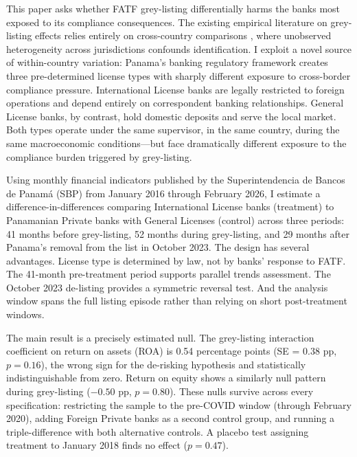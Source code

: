 \documentclass[12pt]{article}
\begin{document}
This paper asks whether FATF grey-listing differentially harms the banks most exposed to its compliance consequences. The existing empirical literature on grey-listing effects relies entirely on cross-country comparisons \citep{nkusu2023,imf2021,collin2022,masciandaro2017}, where unobserved heterogeneity across jurisdictions confounds identification. I exploit a novel source of within-country variation: Panama's banking regulatory framework creates three pre-determined license types with sharply different exposure to cross-border compliance pressure. International License banks are legally restricted to foreign operations and depend entirely on correspondent banking relationships. General License banks, by contrast, hold domestic deposits and serve the local market. Both types operate under the same supervisor, in the same country, during the same macroeconomic conditions---but face dramatically different exposure to the compliance burden triggered by grey-listing.

Using monthly financial indicators published by the Superintendencia de Bancos de Panam\'a (SBP) from January 2016 through February 2026, I estimate a difference-in-differences comparing International License banks (treatment) to Panamanian Private banks with General Licenses (control) across three periods: 41 months before grey-listing, 52 months during grey-listing, and 29 months after Panama's removal from the list in October 2023. The design has several advantages. License type is determined by law, not by banks' response to FATF. The 41-month pre-treatment period supports parallel trends assessment. The October 2023 de-listing provides a symmetric reversal test. And the analysis window spans the full listing episode rather than relying on short post-treatment windows.

The main result is a precisely estimated null. The grey-listing interaction coefficient on return on assets (ROA) is 0.54 percentage points (SE = 0.38 pp, $p = 0.16$), the wrong sign for the de-risking hypothesis and statistically indistinguishable from zero. Return on equity shows a similarly null pattern during grey-listing ($-0.50$ pp, $p = 0.80$). These nulls survive across every specification: restricting the sample to the pre-COVID window (through February 2020), adding Foreign Private banks as a second control group, and running a triple-difference with both alternative controls. A placebo test assigning treatment to January 2018 finds no effect ($p = 0.47$).
\end{document}
